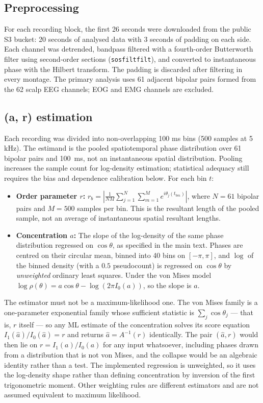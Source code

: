 \documentclass{article}
\begin{document}
\subsection{Preprocessing}

For each recording block, the first 26 seconds were downloaded from the public S3 bucket: 20 seconds of analysed data with 3 seconds of padding on each side. Each channel was detrended, bandpass filtered with a fourth-order Butterworth filter using second-order sections (\texttt{sosfiltfilt}), and converted to instantaneous phase with the Hilbert transform. The padding is discarded after filtering in every montage. The primary analysis uses 61 adjacent bipolar pairs formed from the 62 scalp EEG channels; EOG and EMG channels are excluded.

\subsection{(a, r) estimation}

Each recording was divided into non-overlapping 100 ms bins (500 samples at 5 kHz). The estimand is the pooled spatiotemporal phase distribution over 61 bipolar pairs and 100~ms, not an instantaneous spatial distribution. Pooling increases the sample count for log-density estimation; statistical adequacy still requires the bias and dependence calibration below. For each bin $t$:

\begin{itemize}
\item \textbf{Order parameter $r$:} $r_b = \left|\frac{1}{NM}\sum_{j=1}^{N}\sum_{m=1}^{M} e^{i\theta_j(t_{bm})}\right|$, where $N=61$ bipolar pairs and $M=500$ samples per bin. This is the resultant length of the pooled sample, not an average of instantaneous spatial resultant lengths.
\item \textbf{Concentration $a$:} The slope of the log-density of the same phase distribution regressed on $\cos\theta$, as specified in the main text. Phases are centred on their circular mean, binned into 40 bins on $[-\pi,\pi]$, and $\log$ of the binned density (with a $0.5$ pseudocount) is regressed on $\cos\theta$ by \emph{unweighted} ordinary least squares. Under the von Mises model $\log\rho(\theta) = a\cos\theta - \log(2\pi I_0(a))$, so the slope is $a$.
\end{itemize}

The estimator must not be a maximum-likelihood one. The von Mises family is a one-parameter
exponential family whose sufficient statistic is $\sum_j \cos\theta_j$ --- that is, $r$ itself --- so
any ML estimate of the concentration solves its score equation $I_1(\hat a)/I_0(\hat a) = r$ and
returns $\hat a = A^{-1}(r)$ identically. The pair $(\hat a, r)$ would then lie on
$r = I_1(a)/I_0(a)$ for any input whatsoever, including phases drawn from a distribution that is not
von Mises, and the collapse would be an algebraic identity rather than a test. The implemented regression is unweighted, so it uses the log-density shape rather than defining concentration by inversion of the first trigonometric moment. Other weighting rules are different estimators and are not assumed equivalent to maximum likelihood.
\end{document}
